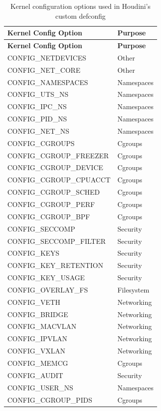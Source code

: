 \begin{doublespace}
\begin{longtable}{|l|l|}
\caption{Kernel configuration options used in Houdini’s custom defconfig} \label{tab:kernel-config-categorized} \\
\hline
\textbf{Kernel Config Option} & \textbf{Purpose} \\
\hline
\endfirsthead

\hline
\textbf{Kernel Config Option} & \textbf{Purpose} \\
\hline
\endhead

CONFIG\_NETDEVICES & Other \\
CONFIG\_NET\_CORE & Other \\
CONFIG\_NAMESPACES & Namespaces \\
CONFIG\_UTS\_NS & Namespaces \\
CONFIG\_IPC\_NS & Namespaces \\
CONFIG\_PID\_NS & Namespaces \\
CONFIG\_NET\_NS & Namespaces \\
CONFIG\_CGROUPS & Cgroups \\
CONFIG\_CGROUP\_FREEZER & Cgroups \\
CONFIG\_CGROUP\_DEVICE & Cgroups \\
CONFIG\_CGROUP\_CPUACCT & Cgroups \\
CONFIG\_CGROUP\_SCHED & Cgroups \\
CONFIG\_CGROUP\_PERF & Cgroups \\
CONFIG\_CGROUP\_BPF & Cgroups \\
CONFIG\_SECCOMP & Security \\
CONFIG\_SECCOMP\_FILTER & Security \\
CONFIG\_KEYS & Security \\
CONFIG\_KEY\_RETENTION & Security \\
CONFIG\_KEY\_USAGE & Security \\
CONFIG\_OVERLAY\_FS & Filesystem \\
CONFIG\_VETH & Networking \\
CONFIG\_BRIDGE & Networking \\
CONFIG\_MACVLAN & Networking \\
CONFIG\_IPVLAN & Networking \\
CONFIG\_VXLAN & Networking \\
CONFIG\_MEMCG & Cgroups \\
CONFIG\_AUDIT & Security \\
CONFIG\_USER\_NS & Namespaces \\
CONFIG\_CGROUP\_PIDS & Cgroups \\

\end{longtable}
\end{doublespace}
